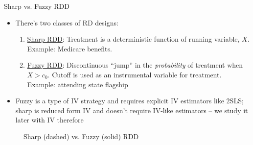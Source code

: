 \documentclass{beamer}
\begin{document}
\begin{frame}{Sharp vs. Fuzzy RDD}
	
\begin{itemize}
\item There's two classes of RD designs:
	\begin{enumerate}
	\item \underline{Sharp RDD}: Treatment is a deterministic function of running variable, $X$. Example: Medicare benefits.  
	\item \underline{Fuzzy RDD}: Discontinuous ``jump'' in the \emph{probability} of treatment when $X>c_0$.  Cutoff is used as an instrumental variable for treatment.  Example: attending state flagship
	\end{enumerate}
\item Fuzzy is a type of IV strategy and requires explicit IV estimators like 2SLS; sharp is reduced form IV and doesn't require IV-like estimators -- we study it later with IV therefore
\end{itemize}	

\end{frame}	


\begin{frame}[plain]
\begin{figure}
\centering
{}
\caption{Sharp (dashed) vs. Fuzzy (solid) RDD}
\end{figure}

	

\end{frame}
\end{document}

